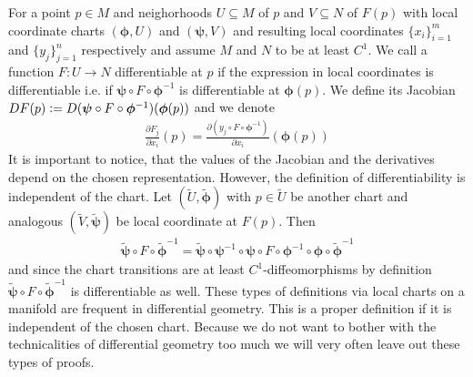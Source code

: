 \documentclass[../master_thesis.tex]{subfiles}
\begin{document}
For a point $p \in M$ and neighorhoods $U \subseteq M$ of $p$ and 
$V \subseteq N$ of $F(p)$ with local coordinate charts 
$(\boldsymbol{\phi}, U)$ and $(\boldsymbol{\psi}, V)$  and resulting local coordinates 
$\{x_i\}_{i=1}^m$ and $\{ y_j\}_{j=1}^n$ respectively and assume 
$M$ and $N$ to be at least $C^1$. We call a function 
$F: U \rightarrow N$ differentiable at $p$ if the expression in local coordinates
is differentiable i.e. if 
$\boldsymbol{\psi} \circ F \circ \boldsymbol{\phi}^{-1}$ is differentiable
at $\boldsymbol{\phi}(p)$.
We define its Jacobian $DF(p) \vcentcolon= D(\boldsymbol{\psi} \circ F \circ 
\boldsymbol{\phi}^{-1})(\boldsymbol{\phi}(p))$ 
and we denote 
\begin{align}
    \frac{\partial F_j}{\partial x_i}(p) 
    = \frac{\partial (y_j \circ F \circ \boldsymbol{\phi}^{-1})}{\partial x_i} (\boldsymbol{\phi}(p))
    \label{eq:derivative_on_manifold} 
\end{align}
It is important to notice, that the values of the Jacobian 
and the derivatives depend on the chosen representation.
However, the definition of differentiability is independent of the chart. 
Let $(\tilde{U},\boldsymbol{\tilde{\phi}})$ with $p \in \tilde{U}$ be 
another chart and analogous $(\tilde{V},\boldsymbol{\tilde{\psi}})$ be local coordinate 
at $F(p)$.
Then 
\begin{align*}
    \boldsymbol{\tilde{\psi}} \circ F \circ \boldsymbol{\tilde{\phi}}^{-1} 
    = \boldsymbol{\tilde{\psi}} \circ \bm{\psi}^{-1} \circ \bm{\psi} \circ F \circ \bm{\phi}^{-1} 
        \circ \bm{\phi} \circ \boldsymbol{\tilde{\phi}}^{-1}
\end{align*}
and since the chart transitions are at least $C^1$-diffeomorphisms by definition
$\boldsymbol{\tilde{\psi}} \circ F \circ \boldsymbol{\tilde{\phi}}^{-1} $ is differentiable as well.
These types of definitions via local charts on a manifold are frequent in
differential geometry. This is a proper definition if it is independent of the 
chosen chart. Because we do not want to bother with the technicalities of 
differential geometry too much we will very often leave out these types of
proofs. 
\end{document}
